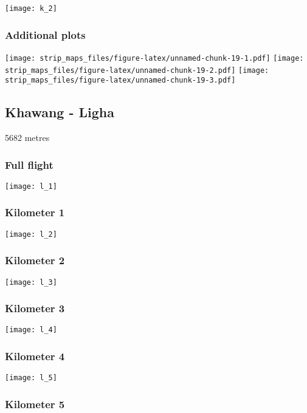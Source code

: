 \documentclass[]{article}
\begin{document}
\texttt{[image: k\_2]}

\subsubsection{Additional plots}\label{additional-plots-10}

\texttt{[image: strip\_maps\_files/figure-latex/unnamed-chunk-19-1.pdf]}
\texttt{[image: strip\_maps\_files/figure-latex/unnamed-chunk-19-2.pdf]}
\texttt{[image: strip\_maps\_files/figure-latex/unnamed-chunk-19-3.pdf]}

\newpage

\subsection{Khawang - Ligha}\label{khawang---ligha}

5682 metres

\subsubsection{Full flight}\label{full-flight-11}

\texttt{[image: l\_1]}

\subsubsection{Kilometer 1}\label{kilometer-1-11}

\texttt{[image: l\_2]}

\subsubsection{Kilometer 2}\label{kilometer-2-11}

\texttt{[image: l\_3]}

\subsubsection{Kilometer 3}\label{kilometer-3-11}

\texttt{[image: l\_4]}

\subsubsection{Kilometer 4}\label{kilometer-4-11}

\texttt{[image: l\_5]}

\subsubsection{Kilometer 5}\label{kilometer-5-11}
\end{document}
